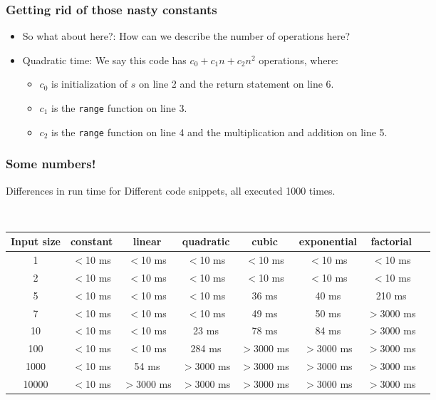 \begin{frame}
	\frametitle{Getting rid of those nasty constants}

	\begin{itemize}
		\item So what about here?:	How can we describe the number of operations here?	
		\item Quadratic time:
				We say this code has $c_0 + c_1n + c_2 n^2$ operations, where:
				\begin{itemize}
					\item $c_0$ is initialization of $s$ on line 2 and the return statement on line 6.
					\item $c_1$ is the \texttt{range} function on line 3.
					\item $c_2$ is the \texttt{range} function on line 4 and the multiplication and addition on line 5.
				\end{itemize}
			\end{itemize}
			

			
\end{frame}

\begin{frame}
	\frametitle{Some numbers!}
	
Differences in run time for	Different code snippets, all executed 1000 times.

		\hfill\\
		\begin{tabular}{c | c c c c c c c}
			\scriptsize
			Input size & constant & linear & quadratic & cubic & exponential & factorial\\
			\midrule
			
			1 & $<$10 ms & $<$10 ms & $<$10 ms & $<$10 ms & $<$10 ms & $<$10 ms\\
			2 & $<$10 ms & $<$10 ms & $<$10 ms & $<$10 ms & $<$10 ms & $<$10 ms\\
			
			5 & $<$10 ms & $<$10 ms & $<$10 ms & 36 ms & 40 ms & 210 ms\\
			
			7 & $<$10 ms & $<$10 ms & $<$10 ms & 49 ms & 50 ms & \alert{$>$3000 ms} \\
			
			10 & $<$10 ms & $<$10 ms & 23 ms & 78 ms & 84 ms & \alert{$>$3000 ms}\\
			
			100 & $<$10 ms & $<$10 ms & 284 ms & \alert{$>$3000 ms} & \alert{$>$3000 ms} & \alert{$>$3000 ms} \\
			
			1000 & $<$10 ms & 54 ms & \alert{$>$3000 ms} &\alert{$>$3000 ms} & \alert{$>$3000 ms} & \alert{$>$3000 ms} \\
			
			10000 & $<$10 ms &  \alert{$>$3000 ms} &\alert{$>$3000 ms} &\alert{$>$3000 ms} & \alert{$>$3000 ms} & \alert{$>$3000 ms} \\
		\end{tabular}
\end{frame}

